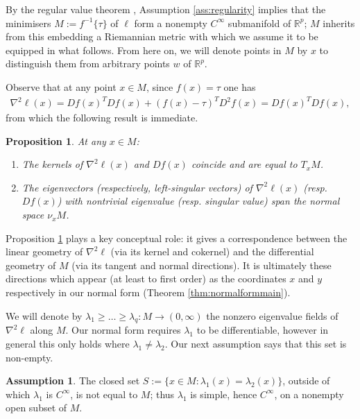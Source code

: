 \documentclass{article}
\newcommand{\RB}{\mathbb{R}}
\theoremstyle{plain}
\newtheorem{proposition}[theorem]{Proposition}
\theoremstyle{definition}
\newtheorem{assumption}[theorem]{Assumption}
\theoremstyle{remark}
\begin{document}
By the regular value theorem \cite[Chapter 1, Theorem 3.2]{hirsch}, Assumption \ref{ass:regularity} implies that the minimisers $M:=f^{-1}\{\tau\}$ of $\ell$ form a nonempty $C^{\infty}$ submanifold of $\RB^p$; $M$ inherits from this embedding a Riemannian metric with which we assume it to be equipped in what follows. From here on, we will denote points in $M$ by $x$ to distinguish them from arbitrary points $w$ of $\RB^p$.

Observe that at any point $x\in M$, since $f(x) = \tau$ one has 
\begin{align}
\nabla^2\ell(x) = Df(x)^TDf(x) + (f(x)-\tau)^TD^2f(x) = Df(x)^TDf(x),
\end{align}
from which the following result is immediate.

\begin{proposition}\label{prop:decomposition}
At any $x\in M$:
    \begin{enumerate}[leftmargin=*]
        \item The kernels of $\nabla^2\ell(x)$ and $Df(x)$ coincide and are equal to $T_xM$.
        \item The eigenvectors (respectively, left-singular vectors) of $\nabla^2\ell(x)$ (resp. $Df(x)$) with nontrivial eigenvalue (resp. singular value) span the normal space $\nu_xM$.
    \end{enumerate}
\end{proposition}

Proposition \ref{prop:decomposition} plays a key conceptual role: it gives a correspondence between the linear geometry of $\nabla^2\ell$ (via its kernel and cokernel) and the differential geometry of $M$ (via its tangent and normal directions). It is ultimately these directions which appear (at least to first order) as the coordinates $x$ and $y$ respectively in our normal form (Theorem \ref{thm:normalformmain}).

We will denote by $\lambda_1\geq\dots\geq\lambda_q:M\rightarrow(0,\infty)$ the nonzero eigenvalue fields of $\nabla^2\ell$ along $M$. Our normal form requires $\lambda_1$ to be differentiable, however in general this only holds where $\lambda_1\neq \lambda_2$. Our next assumption says that this set is non-empty.

\begin{assumption}\label{ass:unique}
    The closed set $S:=\{x\in M:\lambda_1(x) = \lambda_2(x)\}$, outside of which $\lambda_1$ is $C^{\infty}$, is not equal to $M$; thus $\lambda_1$ is simple, hence $C^{\infty}$, on a nonempty open subset of $M$.
\end{assumption}
\end{document}
